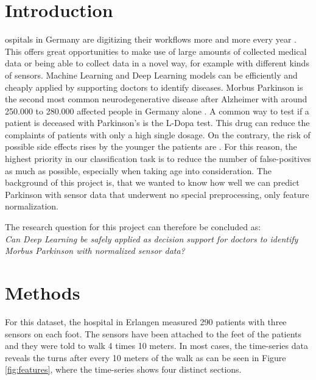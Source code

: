 \documentclass[journal]{IEEEtran}
\begin{document}
\section{Introduction}
ospitals in Germany are digitizing their workflows more and more every year \cite{cite2}. This offers great opportunities to make use of large amounts of collected medical data or being able to collect data in a novel way, for example with different kinds of sensors. Machine Learning and Deep Learning models can be efficiently and cheaply applied by supporting doctors to identify diseases.
Morbus Parkinson is the second most common neurodegenerative disease after Alzheimer with around 250.000 to 280.000 affected people in Germany alone \cite{cite1}. A common way to test if a patient is deceased with Parkinson's is the L-Dopa test. This drug can reduce the complaints of patients with only a high single dosage. On the contrary, the risk of possible side effects rises by the younger the patients are \cite{cite3}. For this reason, the highest priority in our classification task is to reduce the number of false-positives as much as possible, especially when taking age into consideration. 
The background of this project is, that we wanted to know how well we can predict Parkinson with sensor data that underwent no special preprocessing, only feature normalization.

The research question for this project can therefore be concluded as:
\\ 
\textit{Can Deep Learning be safely applied as decision support for doctors to identify Morbus Parkinson with normalized sensor data?}

\section{Methods}
For this dataset, the hospital in Erlangen measured 290 patients with three sensors on each foot. The sensors have been attached to the feet of the patients and they were told to walk 4 times 10 meters. In most cases, the time-series data reveals the turns after every 10 meters of the walk as can be seen in Figure \ref{fig:features}, where the time-series shows four distinct sections. 
\end{document}
